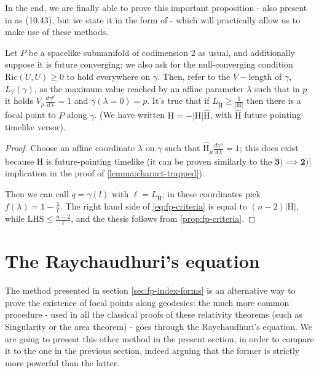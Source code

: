 	In the end, we are finally able to prove this important proposition - also present in \cite{o1983semi} as (10.43), but we state it in the form of \cite{fewster2020new}- which will practically allow us to make use of these methods.
	\begin{corollary}
		\label{cor:fp-criteria}
		Let \(P\) be a spacelike submanifold of codimension \(2\) as usual, and additionally suppose it is future converging; we also ask for the null-converging condition \(\text{Ric}(U, U) \ge 0\) to hold everywhere on \(\gamma\). Then, refer to the \(V-\)length of \(\gamma\), \(L_V(\gamma)\), as the maximum value reached by an affine parameter \(\lambda\) such that in \(p\) it holds \(V_{\mu}\frac{d\gamma^{\mu}}{d\lambda} = 1\) and \(\gamma(\lambda = 0) = p\). It's true that if \(L_{\hat{\mathrm{H}}} \ge \frac{1}{|\mathrm{H}|}\) then there is a focal point to \(P\) along \(\gamma\). (We have written \(\mathrm{H} = - |\mathrm{H}|\hat{\mathrm{H}}\), with \(\hat{\mathrm{H}}\) future pointing timelike versor).
	\end{corollary}

	\begin{proof}
		Choose an affine coordinate \(\lambda\) on \(\gamma\) such that \(\hat{\mathrm{H}}_{\mu}\frac{d\gamma^{\mu}}{d\lambda} = 1\); this does exist because \(\mathrm{H}\) is future-pointing timelike (it can be proven similarly to the \(\mathbf{3) \implies 2)]}\) implication in the proof of \ref{lemma:charact-trapped}).
		
		Then we can call \(q = \gamma(l)\) with \(\ell = L_{\hat{\mathrm{H}}}\); in these coordinates pick \(f(\lambda) = 1 - \frac{\lambda}{\ell}\). The right hand side of \eqref{eq:fp-criteria} is equal to \((n-2)|\mathrm{H}|\), while \(\text{LHS} \le \frac{n - 2}{\ell}\), and the thesis follows from \ref{prop:fp-criteria}.
	\end{proof}
	
	\section{The Raychaudhuri's equation}
	The method presented in section \ref{sec:fp-index-forms} is an alternative way to prove the existence of focal points along geodesics: the much more common procedure - used in all the classical proofs of these relativity theorems (such as Singularity \cite{penrose1965gravitational} or the area theorem) - goes through the Raychaudhuri's equation. We are going to present this other method in the present section, in order to compare it to the one in the previous section, indeed arguing that the former is strictly more powerful than the latter.
	
